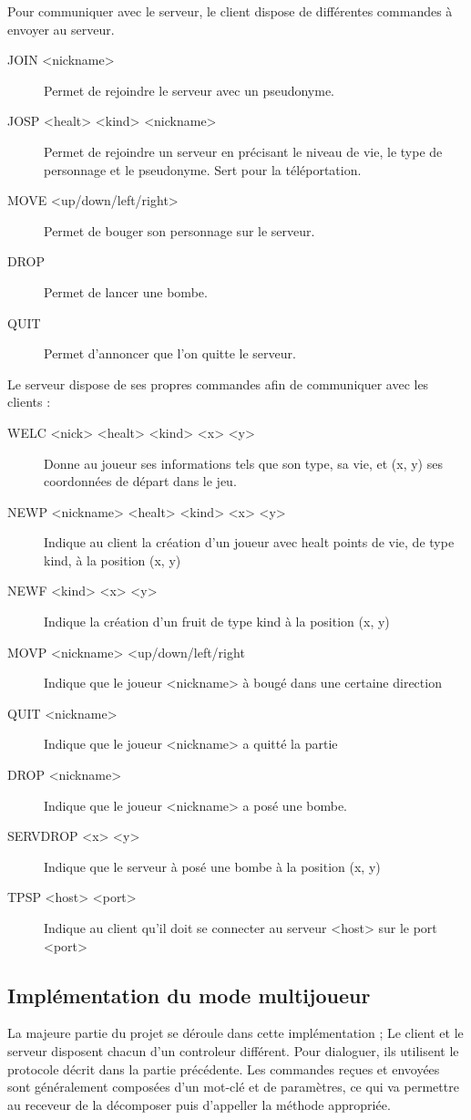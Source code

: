 \documentclass[12pt]{article}
\begin{document}
Pour communiquer avec le serveur, le client dispose de différentes commandes à envoyer au serveur.\\
\begin{description}
\item[JOIN <nickname>] Permet de rejoindre le serveur avec un pseudonyme.
\item[JOSP <healt> <kind> <nickname>] Permet de rejoindre un serveur en précisant le niveau de vie, le type de personnage et le pseudonyme. Sert pour la téléportation.
\item[MOVE <up/down/left/right>] Permet de bouger son personnage sur le serveur.
\item[DROP] Permet de lancer une bombe.
\item[QUIT] Permet d'annoncer que l'on quitte le serveur.
\end{description}
Le serveur dispose de ses propres commandes afin de communiquer avec les clients :\\
\begin{description}
\item[WELC <nick> <healt> <kind> <x> <y>] Donne au joueur ses informations tels que son type, sa vie, et (x, y) ses coordonnées de départ dans le jeu.
\item[NEWP <nickname> <healt> <kind> <x> <y>] Indique au client la création d'un joueur avec healt points de vie, de type kind, à la position (x, y)
\item[NEWF <kind> <x> <y>] Indique la création d'un fruit de type kind à la position (x, y)
\item[MOVP <nickname> <up/down/left/right] Indique que le joueur <nickname> à bougé dans une certaine direction
\item[QUIT <nickname>] Indique que le joueur <nickname> a quitté la partie
\item[DROP <nickname>] Indique que le joueur <nickname> a posé une bombe.
\item[SERVDROP <x> <y>] Indique que le serveur à posé une bombe à la position (x, y)
\item[TPSP <host> <port>] Indique au client qu'il doit se connecter au serveur <host> sur le port <port>
\end{description}

\subsection{Implémentation du mode multijoueur}

La majeure partie du projet se déroule dans cette implémentation ; Le client et le serveur disposent chacun d'un controleur différent. Pour dialoguer, ils utilisent le protocole décrit dans la partie précédente. Les commandes reçues et envoyées sont généralement composées d'un mot-clé et de paramètres, ce qui va permettre au receveur de la décomposer puis d'appeller la méthode appropriée.
\\
\end{document}
